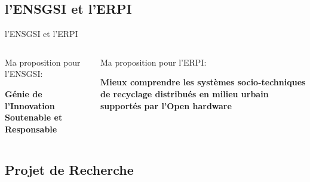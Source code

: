 \documentclass[
  11pt,
  ignorenonframetext,
  aspectratio=169,
  c]{beamer}
\begin{document}
\hypertarget{lensgsi-et-lerpi}{%
\subsection{l'ENSGSI et l'ERPI}\label{lensgsi-et-lerpi}}

\begin{frame}[t]{l'ENSGSI et l'ERPI}
\begin{columns}[T]
\begin{column}[T]{0.5\textwidth}
Ma proposition pour l'ENSGSI: \vspace{1cm}

\textbf{Génie de l'Innovation Soutenable et Responsable}
\end{column}

\begin{column}[T]{0.5\textwidth}
Ma proposition pour l'ERPI:

\vspace{1cm}

\textbf{Mieux comprendre les systèmes socio-techniques de recyclage
distribués en milieu urbain supportés par l'Open hardware}

\vfill
\end{column}
\end{columns}

\large

\normalsize
\end{frame}

\hypertarget{projet-de-recherche}{%
\subsection{Projet de Recherche}\label{projet-de-recherche}}
\end{document}
